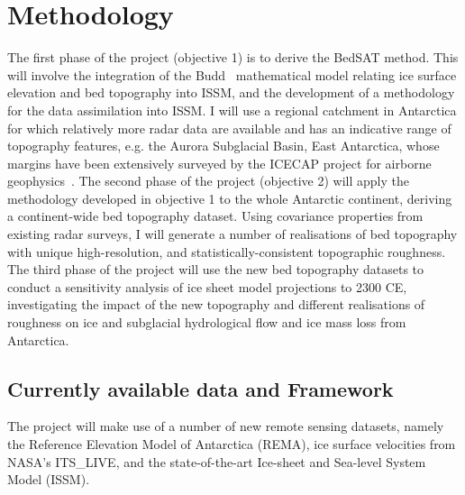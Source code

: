 \chapter*{Methodology}

The first phase of the project (objective 1) is to derive the BedSAT method. This will involve the integration of the Budd~\cite{Budd_1970} mathematical model relating ice surface elevation and bed topography into ISSM, and the development of a methodology for the data assimilation into ISSM. I will use a regional catchment in Antarctica for which relatively more radar data are available and has an indicative range of topography features, e.g. the Aurora Subglacial Basin, East Antarctica, whose margins have been extensively surveyed by the ICECAP project for airborne geophysics~\cite{Young_2011}. The second phase of the project (objective 2) will apply the methodology developed in objective 1 to the whole Antarctic continent, deriving a continent-wide bed topography dataset. Using covariance properties from existing radar surveys, I will generate a number of realisations of bed topography with unique high-resolution, and statistically-consistent topographic roughness. The third phase of the project will use the new bed topography datasets to conduct a sensitivity analysis of ice sheet model projections to 2300 CE, investigating the impact of the new topography and different realisations of roughness on ice and subglacial hydrological flow and ice mass loss from Antarctica.\\


\section*{Currently available data and Framework}\label{data}
The project will make use of a number of new remote sensing datasets, namely the Reference Elevation Model of Antarctica (REMA), ice surface velocities from NASA’s ITS\_LIVE, and the state-of-the-art Ice-sheet and Sea-level System Model (ISSM).

